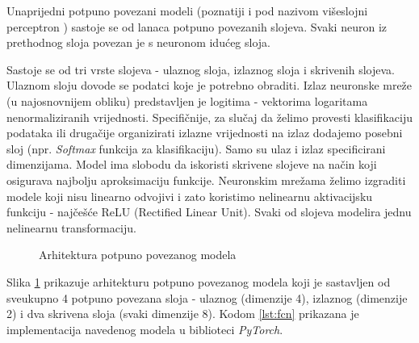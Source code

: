 Unaprijedni potpuno povezani modeli  (poznatiji i pod nazivom višeslojni perceptron ) sastoje se od lanaca potpuno povezanih slojeva. Svaki neuron iz prethodnog sloja povezan je s neuronom idućeg sloja. 

Sastoje se od tri vrste slojeva - ulaznog sloja, izlaznog sloja i skrivenih slojeva. Ulaznom sloju dovode se podatci koje je potrebno obraditi. Izlaz neuronske mreže (u najosnovnijem obliku) predstavljen je logitima  - vektorima logaritama nenormaliziranih vrijednosti. Specifičnije, za slučaj da želimo provesti klasifikaciju podataka ili drugačije organizirati izlazne vrijednosti na izlaz dodajemo posebni sloj (npr. \textit{Softmax} funkcija za klasifikaciju). Samo su ulaz i izlaz specificirani dimenzijama. Model ima slobodu da iskoristi skrivene slojeve na način koji osigurava najbolju aproksimaciju funkcije. Neuronskim mrežama želimo izgraditi modele koji nisu linearno odvojivi i zato koristimo nelinearnu aktivacijsku funkciju - najčešće ReLU (Rectified Linear Unit). Svaki od slojeva modelira jednu nelinearnu transformaciju.

\begin{figure}[H]
    \centering
    \caption{Arhitektura potpuno povezanog modela}
    \label{fig:nn}
\end{figure}

Slika \ref{fig:nn} \cite{NNsvg} prikazuje arhitekturu potpuno povezanog modela koji je sastavljen od sveukupno 4 potpuno povezana sloja - ulaznog (dimenzije 4), izlaznog (dimenzije 2) i dva skrivena sloja (svaki dimenzije 8). Kodom \ref{lst:fcn} prikazana je implementacija navedenog modela u biblioteci \textit{PyTorch}.

\begin{listing}[H]
    \caption{Implementacija potpuno povezanog modela na slici \ref{fig:nn} koristeći biblioteku \textit{PyTorch}}
    \inputminted{python}{snippets/fcn.py}
    \label{lst:fcn}
\end{listing}

